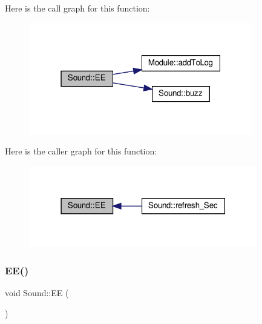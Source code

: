 Here is the call graph for this function\+:
\nopagebreak
\begin{figure}[H]
\begin{center}
\leavevmode
\includegraphics[width=277pt]{class_sound_a8b4af7ef38cf7e66c6dea94d10a9b229_cgraph}
\end{center}
\end{figure}
Here is the caller graph for this function\+:
\nopagebreak
\begin{figure}[H]
\begin{center}
\leavevmode
\includegraphics[width=283pt]{class_sound_a8b4af7ef38cf7e66c6dea94d10a9b229_icgraph}
\end{center}
\end{figure}
\mbox{\label{class_sound_a8b4af7ef38cf7e66c6dea94d10a9b229}} 
\subsubsection{\texorpdfstring{E\+E()}{EE()}\hspace{0.1cm}{\footnotesize\ttfamily [2/2]}}
{\footnotesize\ttfamily void Sound\+::\+EE (\begin{DoxyParamCaption}{ }\end{DoxyParamCaption})\hspace{0.3cm}{\ttfamily [protected]}}

\mbox{\label{class_sound_ab1fb7a2e72d848ca335b4721cd8540b7}} 
